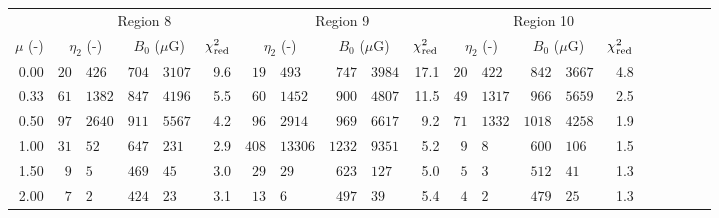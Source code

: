 \begin{tabular}{@{}r r@{ $\pm$ }lr@{ $\pm$ }lr
                     r@{ $\pm$ }lr@{ $\pm$ }lr
                     r@{ $\pm$ }lr@{ $\pm$ }lr
                     r@{ $\pm$ }lr@{ $\pm$ }lr@{}}
\cmidrule{1-21}
{} & \multicolumn{5}{c}{Region 8}
   & \multicolumn{5}{c}{Region 9}
   & \multicolumn{5}{c}{Region 10} \\
\cmidrule(lr){2-6} \cmidrule(lr){7-11} \cmidrule(lr){12-16}
$\mu$ (-) & \multicolumn{2}{c}{$\eta_2$ (-)}
          & \multicolumn{2}{c}{$B_0$ ($\mu$G)} & $\chi^2_{\mathrm{red}}$
          & \multicolumn{2}{c}{$\eta_2$ (-)}
          & \multicolumn{2}{c}{$B_0$ ($\mu$G)} & $\chi^2_{\mathrm{red}}$
          & \multicolumn{2}{c}{$\eta_2$ (-)}
          & \multicolumn{2}{c}{$B_0$ ($\mu$G)} & $\chi^2_{\mathrm{red}}$ \\
\cmidrule{1-16}
0.00 & $20$ & $426$ & $704$ & $3107$ & 9.6
     & $19$ & $493$ & $747$ & $3984$ & 17.1
     & $20$ & $422$ & $842$ & $3667$ & 4.8 \\
0.33 & $61$ & $1382$ & $847$ & $4196$ & 5.5
     & $60$ & $1452$ & $900$ & $4807$ & 11.5
     & $49$ & $1317$ & $966$ & $5659$ & 2.5 \\
0.50 & $97$ & $2640$ & $911$ & $5567$ & 4.2
     & $96$ & $2914$ & $969$ & $6617$ & 9.2
     & $71$ & $1332$ & $1018$ & $4258$ & 1.9 \\
1.00 & $31$ & $52$ & $647$ & $231$ & 2.9
     & $408$ & $13306$ & $1232$ & $9351$ & 5.2
     & $9$ & $8$ & $600$ & $106$ & 1.5 \\
1.50 & $9$ & $5$ & $469$ & $45$ & 3.0
     & $29$ & $29$ & $623$ & $127$ & 5.0
     & $5$ & $3$ & $512$ & $41$ & 1.3 \\
2.00 & $7$ & $2$ & $424$ & $23$ & 3.1
     & $13$ & $6$ & $497$ & $39$ & 5.4
     & $4$ & $2$ & $479$ & $25$ & 1.3 \\


\end{tabular}

